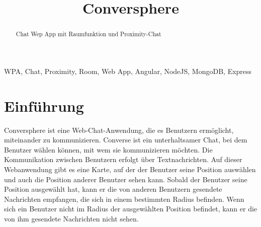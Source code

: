 \documentclass[conference]{IEEEtran}
\begin{document}
	\title{Conversphere}
	\author{
		\and
		\and
		\and
		\and
	}

	\maketitle

	\begin{abstract}
		Chat Wep App mit Raumfunktion und Proximity-Chat
	\end{abstract}

	\begin{IEEEkeywords}
		WPA, Chat, Proximity, Room, Web App, Angular, NodeJS, MongoDB, Express
	\end{IEEEkeywords}

	\section{Einführung}
	Conversphere ist eine Web-Chat-Anwendung, die es Benutzern ermöglicht, miteinander zu kommunizieren. Converse ist ein unterhaltsamer Chat, bei dem Benutzer wählen können, mit wem sie kommunizieren möchten. Die Kommunikation zwischen Benutzern erfolgt über Textnachrichten. Auf dieser Webanwendung gibt es eine Karte, auf der der Benutzer seine Position auswählen und auch die Position anderer Benutzer sehen kann. Sobald der Benutzer seine Position ausgewählt hat, kann er die von anderen Benutzern gesendete Nachrichten empfangen, die sich in einem bestimmten Radius befinden. Wenn sich ein Benutzer nicht im Radius der ausgewählten Position befindet, kann er die von ihm gesendete Nachrichten nicht sehen.
	
\end{document}

